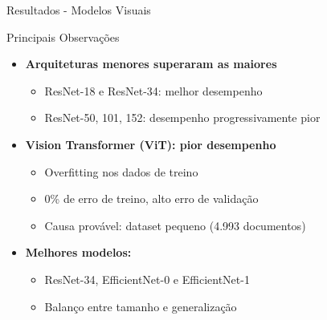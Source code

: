 \begin{frame}{Resultados - Modelos Visuais}
\begin{block}{Principais Observações}
\begin{itemize}
    \item \textbf{Arquiteturas menores superaram as maiores}
    \begin{itemize}
        \item ResNet-18 e ResNet-34: melhor desempenho
        \item ResNet-50, 101, 152: desempenho progressivamente pior
    \end{itemize}
    
    \item \textbf{Vision Transformer (ViT): pior desempenho}
    \begin{itemize}
        \item Overfitting nos dados de treino
        \item 0\% de erro de treino, alto erro de validação
        \item Causa provável: dataset pequeno (4.993 documentos)
    \end{itemize}
    
    \item \textbf{Melhores modelos:}
    \begin{itemize}
        \item ResNet-34, EfficientNet-0 e EfficientNet-1
        \item Balanço entre tamanho e generalização
    \end{itemize}
\end{itemize}
\end{block}
\end{frame}

